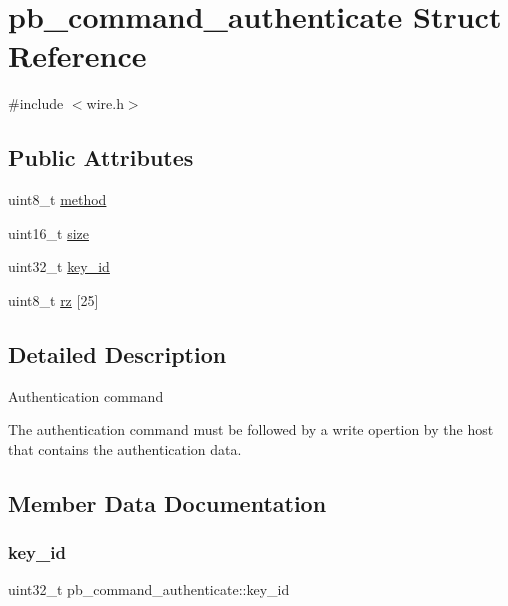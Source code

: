 \hypertarget{structpb__command__authenticate}{}\section{pb\+\_\+command\+\_\+authenticate Struct Reference}
\label{structpb__command__authenticate}


{\ttfamily \#include $<$wire.\+h$>$}

\subsection*{Public Attributes}
\begin{DoxyCompactItemize}
\item 
uint8\+\_\+t \hyperlink{structpb__command__authenticate_acd90b94a995d430da2a6852990f4c97e}{method}
\item 
uint16\+\_\+t \hyperlink{structpb__command__authenticate_a3d67499c136e9580c2670d4e11ebd8c3}{size}
\item 
uint32\+\_\+t \hyperlink{structpb__command__authenticate_a2a045294ae4341302bab1866546d185b}{key\+\_\+id}
\item 
uint8\+\_\+t \hyperlink{structpb__command__authenticate_a8946e60668166aff43b462f59f168828}{rz} \mbox{[}25\mbox{]}
\end{DoxyCompactItemize}


\subsection{Detailed Description}
Authentication command

The authentication command must be followed by a write opertion by the host that contains the authentication data. 

\subsection{Member Data Documentation}
\mbox{\label{structpb__command__authenticate_a2a045294ae4341302bab1866546d185b}} 
\subsubsection{\texorpdfstring{key\+\_\+id}{key\_id}}
{\footnotesize\ttfamily uint32\+\_\+t pb\+\_\+command\+\_\+authenticate\+::key\+\_\+id}

